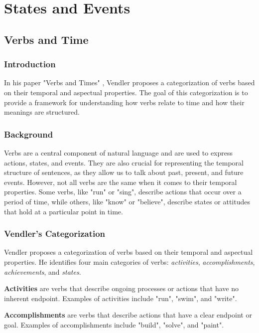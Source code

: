 \chapter{States and Events}
\section{Verbs and Time}
\subsection{Introduction}

In his paper "Verbs and Times" \cite{vendler1957verbs}, Vendler proposes a categorization of verbs based on their temporal and aspectual properties. The goal of this categorization is to provide a framework for understanding how verbs relate to time and how their meanings are structured.

\subsection{Background}

Verbs are a central component of natural language and are used to express actions, states, and events. They are also crucial for representing the temporal structure of sentences, as they allow us to talk about past, present, and future events. However, not all verbs are the same when it comes to their temporal properties. Some verbs, like "run" or "sing", describe actions that occur over a period of time, while others, like "know" or "believe", describe states or attitudes that hold at a particular point in time.

\subsection{Vendler's Categorization}

Vendler proposes a categorization of verbs based on their temporal and aspectual properties. He identifies four main categories of verbs: \textit{activities}, \textit{accomplishments}, \textit{achievements}, and \textit{states}.

\textbf{Activities} are verbs that describe ongoing processes or actions that have no inherent endpoint. Examples of activities include "run", "swim", and "write".


\textbf{Accomplishments} are verbs that describe actions that have a clear endpoint or goal. Examples of accomplishments include "build", "solve", and "paint".


